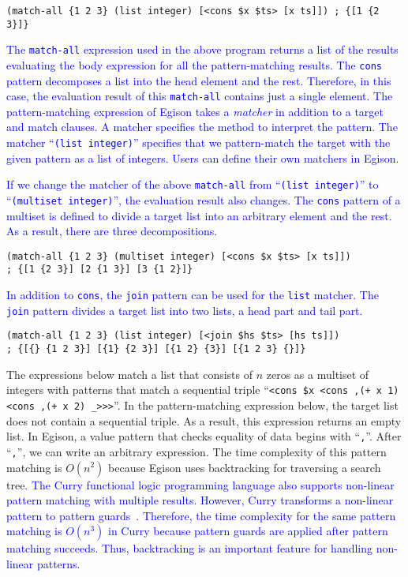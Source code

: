 \documentclass[acmlarge]{acmart}
\newcommand{\new}[1]{\textcolor{blue}{#1}}
\begin{document}
\begin{lstlisting}[language=egison]
(match-all {1 2 3} (list integer) [<cons $x $ts> [x ts]]) ; {[1 {2 3}]}
\end{lstlisting}

\noindent
\new{
The \lstinline{match-all} expression used in the above program returns a list of the results evaluating the body expression for all the pattern-matching results.
The \lstinline{cons} pattern decomposes a list into the head element and the rest.
Therefore, in this case, the evaluation result of this \lstinline{match-all} contains just a single element.
The pattern-matching expression of Egison takes a \emph{matcher} in addition to a target and match clauses.
A matcher specifies the method to interpret the pattern.
The matcher ``\lstinline{(list integer)}'' specifies that we pattern-match the target with the given pattern as a list of integers.
Users can define their own matchers in Egison.
}%

\new{
If we change the matcher of the above \lstinline{match-all} from ``\lstinline{(list integer)}'' to ``\lstinline{(multiset integer)}'', the evaluation result also changes.
The \lstinline{cons} pattern of a multiset is defined to divide a target list into an arbitrary element and the rest.
As a result, there are three decompositions.
}%

\begin{lstlisting}[language=egison]
(match-all {1 2 3} (multiset integer) [<cons $x $ts> [x ts]])
; {[1 {2 3}] [2 {1 3}] [3 {1 2}]}
\end{lstlisting}

\new{
In addition to \lstinline{cons}, the \lstinline{join} pattern can be used for the \lstinline{list} matcher.
The \lstinline{join} pattern divides a target list into two lists, a head part and tail part.
}%

\begin{lstlisting}[language=egison]
(match-all {1 2 3} (list integer) [<join $hs $ts> [hs ts]])
; {[{} {1 2 3}] [{1} {2 3}] [{1 2} {3}] [{1 2 3} {}]}
\end{lstlisting}

The expressions below match a list that consists of $n$ zeros as a multiset of integers with patterns that match a sequential triple ``\lstinline{<cons $x <cons ,(+ x 1) <cons ,(+ x 2) _>>>}''.
In the pattern-matching expression below, the target list does not contain a sequential triple.
As a result, this expression returns an empty list.
In Egison, a value pattern that checks equality of data begins with ``\lstinline{,}''.
After ``\lstinline{,}'',  we can write an arbitrary expression.
The time complexity of this pattern matching is $O(n^2)$ because Egison uses backtracking for traversing a search tree.
\new{
The Curry functional logic programming language also supports non-linear pattern matching with multiple results.
However, Curry transforms a non-linear pattern to pattern guards~\cite{antoy2010programming,antoy2001constructor,hanus2007multi}.
Therefore, the time complexity for the same pattern matching is $O(n^3)$ in Curry because pattern guards are applied after pattern matching succeeds.
Thus, backtracking is an important feature for handling non-linear patterns.
}%
\end{document}

